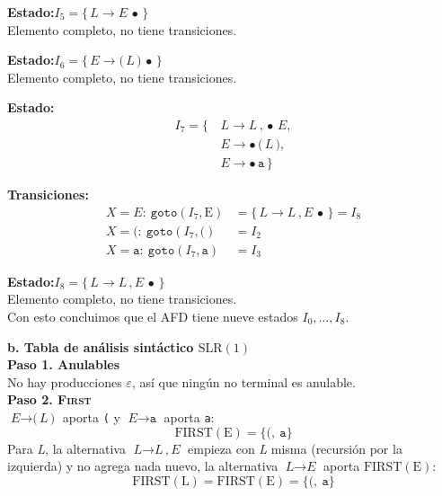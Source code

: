 \documentclass[12pt,letterpaper]{article}
\newcommand{\nt}[1]{\textit{#1}}
\newcommand{\tk}[1]{\texttt{#1}}
\newcommand{\tx}[1]{\text{#1}}
\newcommand{\First}[1]{\mathrm{FIRST}(#1)}
\newcommand{\slr}{\mathrm{SLR(1)}}
\newcommand{\eps}{\varepsilon}
\begin{document}
\begin{enumerate}[label=\arabic*.]
  \medskip

  \textbf{Estado:}\quad $I_5 = \{\,\nt{L}\to\nt{E}\,\bullet\,\}$\\
  Elemento completo, no tiene transiciones.

  \medskip

  \textbf{Estado:}\quad $I_6 = \{\,\nt{E}\to\tk{(}\,\nt{L}\,\tk{)}\,\bullet\,\}$\\
  Elemento completo, no tiene transiciones.

  \medskip

  \textbf{Estado:}
  \[
  \begin{aligned}
    I_7 = \{\, & \nt{L}\to\nt{L}\,\tk{,}\,\bullet\,\nt{E},\\
               & \nt{E}\to\bullet\,\tk{(}\,\nt{L}\,\tk{)},\\
               & \nt{E}\to\bullet\,\tk{a}\,\}
  \end{aligned}
  \]

  \textbf{Transiciones:}
  \[
  \begin{aligned}
    X=\nt{E}:\ \texttt{goto}(I_7,\tx{E}) &= \{\,\nt{L}\to\nt{L}\,\tk{,}\,\nt{E}\,\bullet\,\} = \boxed{I_8}\\[3pt]
    X=\tk{(}:\ \texttt{goto}(I_7,\tk{(}) &= I_2\\[3pt]
    X=\tk{a}:\ \texttt{goto}(I_7,\tk{a}) &= I_3
  \end{aligned}
  \]

  \medskip

  \textbf{Estado:}\quad $I_8 = \{\,\nt{L}\to\nt{L}\,\tk{,}\,\nt{E}\,\bullet\,\}$\\
  Elemento completo, no tiene transiciones.\\

  Con esto concluimos que el AFD tiene nueve estados $I_0,\ldots,I_8$.

  \bigskip

  \textbf{\large b. Tabla de análisis sintáctico $\slr$}\\

  \textbf{Paso 1. Anulables}\\
  No hay producciones $\eps$, así que ningún no terminal es anulable.\\

  \textbf{Paso 2. \textsc{First}}\\
  $\nt{E}\to\tk{(}\,\nt{L}\,\tk{)}$ aporta \tk{(} y $\nt{E}\to\tk{a}$ aporta \tk{a}:
  \[
  \First{\tx{E}} = \{\tk{(},\ \tk{a}\}
  \]
  Para \nt{L}, la alternativa $\nt{L}\to\nt{L}\,\tk{,}\,\nt{E}$ empieza con \nt{L} misma (recursión por la
  izquierda) y no agrega nada nuevo, la alternativa $\nt{L}\to\nt{E}$ aporta $\First{\tx{E}}$:
  \[
  \First{\tx{L}} = \First{\tx{E}} = \{\tk{(},\ \tk{a}\}
  \]


\end{enumerate}
\end{document}

